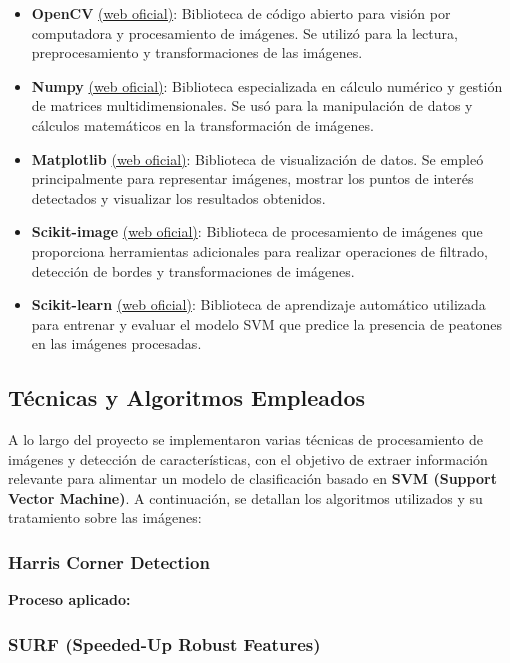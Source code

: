 \documentclass[a4paper]{article}
\begin{document}
\begin{itemize}
\item \textbf{OpenCV} \href{https://opencv.org/}{(web oficial)}: Biblioteca de código abierto para visión por computadora y procesamiento de imágenes. Se utilizó para la lectura, preprocesamiento y transformaciones de las imágenes.
\item \textbf{Numpy} \href{https://numpy.org/}{(web oficial)}: Biblioteca especializada en cálculo numérico y gestión de matrices multidimensionales. Se usó para la manipulación de datos y cálculos matemáticos en la transformación de imágenes.
\item \textbf{Matplotlib} \href{https://matplotlib.org/}{(web oficial)}: Biblioteca de visualización de datos. Se empleó principalmente para representar imágenes, mostrar los puntos de interés detectados y visualizar los resultados obtenidos.
\item \textbf{Scikit-image} \href{https://scikit-image.org/}{(web oficial)}: Biblioteca de procesamiento de imágenes que proporciona herramientas adicionales para realizar operaciones de filtrado, detección de bordes y transformaciones de imágenes.
\item \textbf{Scikit-learn} \href{https://scikit-learn.org/}{(web oficial)}: Biblioteca de aprendizaje automático utilizada para entrenar y evaluar el modelo SVM que predice la presencia de peatones en las imágenes procesadas.
\end{itemize}

\subsection{Técnicas y Algoritmos Empleados}

A lo largo del proyecto se implementaron varias técnicas de procesamiento de imágenes y detección de características, con el objetivo de extraer información relevante para alimentar un modelo de clasificación basado en \textbf{SVM (Support Vector Machine)}. A continuación, se detallan los algoritmos utilizados y su tratamiento sobre las imágenes:

\subsubsection{Harris Corner Detection}


\textbf{Proceso aplicado:}


\subsubsection{SURF (Speeded-Up Robust Features)}
\end{document}
